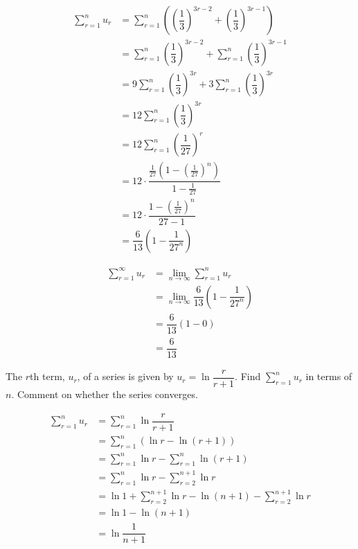 \documentclass{jhwhw}
\begin{document}
    \solution
        \begin{align*}
            \sum\limits_{r=1}^n u_r &= \sum\limits_{r=1}^n \left(\left(\dfrac13\right)^{3r-2} + \left(\dfrac13\right)^{3r-1}\right)\\
            &= \sum\limits_{r=1}^n \left(\dfrac13\right)^{3r-2} + \sum\limits_{r=1}^n \left(\dfrac13\right)^{3r-1}\\
            &= 9\sum\limits_{r=1}^n \left(\dfrac13\right)^{3r} + 3\sum\limits_{r=1}^n \left(\dfrac13\right)^{3r}\\
            &= 12\sum\limits_{r=1}^n \left(\dfrac13\right)^{3r}\\
            &= 12\sum\limits_{r=1}^n \left(\dfrac1{27}\right)^{r}\\
            &= 12 \cdot \dfrac{\tfrac1{27}(1-(\tfrac1{27})^n)}{1-\tfrac1{27}}\\
            &= 12 \cdot \dfrac{1-(\tfrac1{27})^n}{27 - 1}\\
            &= \dfrac{6}{13} \left(1-\dfrac1{27^n}\right)
        \end{align*}


        \begin{align*}
            \sum\limits_{r=1}^\infty u_r &= \lim_{n \rightarrow \infty} \sum\limits_{r=1}^n u_r\\
            &= \lim_{n \rightarrow \infty} \dfrac{6}{13} \left(1-\dfrac1{27^n}\right)\\
            &= \dfrac{6}{13} (1-0)\\
            &= \dfrac6{13}
        \end{align*}


    \problem{}
        The $r$th term, $u_r$, of a series is given by $u_r = \ln \dfrac{r}{r+1}$. Find $\sum\limits_{r=1}^n u_r$ in terms of $n$. Comment on whether the series converges.

    \solution
        \begin{align*}
            \sum\limits_{r=1}^n u_r &= \sum\limits_{r=1}^n \ln \dfrac{r}{r+1}\\
            &= \sum\limits_{r=1}^n (\ln r - \ln (r+1))\\
            &= \sum\limits_{r=1}^n \ln r - \sum\limits_{r=1}^n\ln (r+1)\\
            &= \sum\limits_{r=1}^n \ln r - \sum\limits_{r=2}^{n+1}\ln r\\
            &= \ln 1 + \sum\limits_{r=2}^{n+1} \ln r - \ln (n+1) - \sum\limits_{r=2}^{n+1}\ln r\\
            &= \ln 1 - \ln (n+1)\\
            &= \ln \dfrac1{n+1}
        \end{align*}
\end{document}
